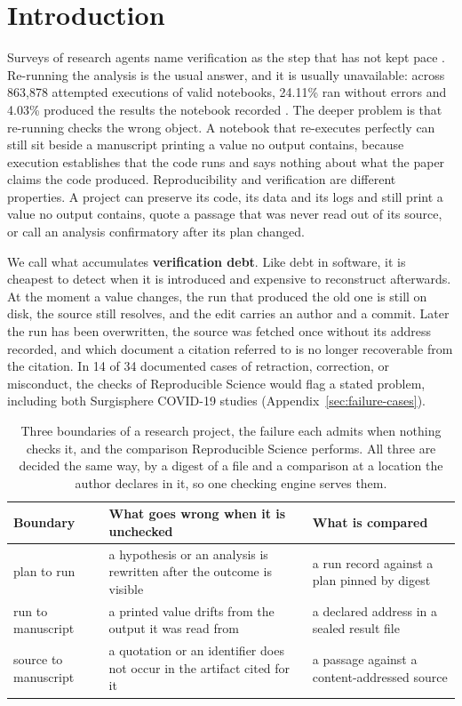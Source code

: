 \documentclass{article}
\begin{document}
\section{Introduction}
\label{sec:intro}

Surveys of research agents name verification as the step that has not kept pace
\citep{ding2026verificationgap}. Re-running the analysis is the usual answer, and it is
usually unavailable: across 863{,}878
attempted executions of valid notebooks, 24.11\% ran without errors and 4.03\% produced the
results the notebook recorded \citep{pimentel2019notebooks}. The deeper problem is that
re-running checks the wrong object. A notebook that re-executes perfectly can still sit beside a
manuscript printing a value no output contains, because execution establishes that the code runs
and says nothing about what the paper claims the code produced. Reproducibility and verification
are different properties. A project can preserve its code, its data and its logs and still
print a value no output contains, quote a passage that was never read out of its source, or call an analysis
confirmatory after its plan changed.

We call what accumulates \textbf{verification debt}. Like debt in software, it is cheapest to
detect when it is introduced and expensive to reconstruct afterwards. At the moment a value
changes, the run that produced the old one is still on disk, the source still resolves, and the
edit carries an author and a commit. Later the run has been overwritten, the source was fetched
once without its address recorded, and which document a citation referred to is no longer
recoverable from the citation. In 14 of 34 documented cases of retraction, correction, or
misconduct, the checks of Reproducible Science would flag a stated problem, including both Surgisphere
COVID-19 studies (Appendix~\ref{sec:failure-cases}).

\begin{table}[h]
\centering
\small
\caption{Three boundaries of a research project, the failure each admits when nothing checks it,
and the comparison Reproducible Science performs. All three are decided the same way, by a digest of a file
and a comparison at a location the author declares in it, so one checking engine serves them.}
\label{tab:boundaries}
\begin{tabular}{@{}>{\raggedright\arraybackslash}p{}>{\raggedright\arraybackslash}p{}>{\raggedright\arraybackslash}p{}@{}}
\toprule
\textbf{Boundary} & \textbf{What goes wrong when it is unchecked} & \textbf{What is compared} \\
\midrule
plan to run & a hypothesis or an analysis is rewritten after the outcome is visible & a run record against a plan pinned by digest \\
run to manuscript & a printed value drifts from the output it was read from & a declared address in a sealed result file \\
source to manuscript & a quotation or an identifier does not occur in the artifact cited for it & a passage against a content-addressed source \\
\bottomrule
\end{tabular}
\end{table}
\end{document}
